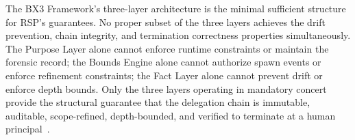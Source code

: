 The BX3 Framework's three-layer architecture is the minimal sufficient structure for RSP's guarantees. No proper subset of the three layers achieves the drift prevention, chain integrity, and termination correctness properties simultaneously. The Purpose Layer alone cannot enforce runtime constraints or maintain the forensic record; the Bounds Engine alone cannot authorize spawn events or enforce refinement constraints; the Fact Layer alone cannot prevent drift or enforce depth bounds. Only the three layers operating in mandatory concert provide the structural guarantee that the delegation chain is immutable, auditable, scope-refined, depth-bounded, and verified to terminate at a human principal~\cite{bx3_framework_2026}.
